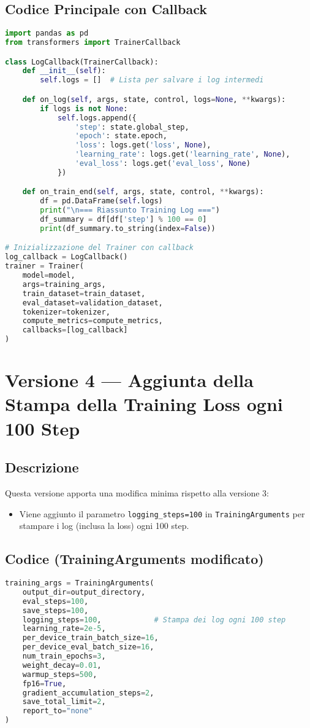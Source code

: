 \documentclass[a4paper,12pt]{article}
\begin{document}
\subsection*{Codice Principale con Callback}
\begin{lstlisting}[language=Python, caption={Versione 3 --- Logging Personalizzato}]
import pandas as pd
from transformers import TrainerCallback

class LogCallback(TrainerCallback):
    def __init__(self):
        self.logs = []  # Lista per salvare i log intermedi

    def on_log(self, args, state, control, logs=None, **kwargs):
        if logs is not None:
            self.logs.append({
                'step': state.global_step,
                'epoch': state.epoch,
                'loss': logs.get('loss', None),
                'learning_rate': logs.get('learning_rate', None),
                'eval_loss': logs.get('eval_loss', None)
            })

    def on_train_end(self, args, state, control, **kwargs):
        df = pd.DataFrame(self.logs)
        print("\n=== Riassunto Training Log ===")
        df_summary = df[df['step'] % 100 == 0]
        print(df_summary.to_string(index=False))

# Inizializzazione del Trainer con callback
log_callback = LogCallback()
trainer = Trainer(
    model=model,
    args=training_args,
    train_dataset=train_dataset,
    eval_dataset=validation_dataset,
    tokenizer=tokenizer,
    compute_metrics=compute_metrics,
    callbacks=[log_callback]
)
\end{lstlisting}

\section{Versione 4 --- Aggiunta della Stampa della Training Loss ogni 100 Step}
\subsection*{Descrizione}
Questa versione apporta una modifica minima rispetto alla versione 3:
\begin{itemize}
    \item Viene aggiunto il parametro \texttt{logging\_steps=100} in \texttt{TrainingArguments} per stampare i log (inclusa la loss) ogni 100 step.
\end{itemize}

\subsection*{Codice (TrainingArguments modificato)}
\begin{lstlisting}[language=Python, caption={Versione 4 --- Logging Steps}]
training_args = TrainingArguments(
    output_dir=output_directory,
    eval_steps=100,
    save_steps=100,
    logging_steps=100,            # Stampa dei log ogni 100 step
    learning_rate=2e-5,
    per_device_train_batch_size=16,
    per_device_eval_batch_size=16,
    num_train_epochs=3,
    weight_decay=0.01,
    warmup_steps=500,
    fp16=True,
    gradient_accumulation_steps=2,
    save_total_limit=2,
    report_to="none"
)
\end{lstlisting}
\end{document}
